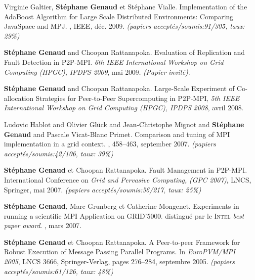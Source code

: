 \documentclass[11pt]{article}
\newcommand{\pmpi}{\mbox{\textsc{P2P-MPI}}}
\begin{document}
\begin{thebibliography}{99}
\newblock Virginie Galtier, \textbf{Stéphane Genaud} et Stéphane Vialle.
\newblock Implementation of the AdaBoost Algorithm for Large Scale Distributed 
Environments: Comparing JavaSpace and MPJ.
, 
IEEE, déc. 2009.
\newblock \small{\textit{(papiers acceptés/soumis:91/305, taux: 29\%)}}


\textbf{Stéphane Genaud} and Choopan Rattanapoka.
\newblock Evaluation of Replication and Fault Detection in P2P-MPI.
\newblock 
{\em 6th IEEE International Workshop on Grid Computing (HPGC), IPDPS 2009}, 
mai 2009.
\newblock \textit{(Papier invité)}.

\textbf{Stéphane Genaud} and Choopan Rattanapoka. 
\newblock Large-Scale Experiment of Co-allocation Strategies for Peer-to-Peer 
Supercomputing in P2P-MPI,
\newblock 
{\em 5th IEEE International Workshop on Grid Computing (HPGC), IPDPS 2008}, 
avril 2008.

Ludovic Hablot and Olivier Glück and Jean-Christophe Mignot and \textbf{Stéphane Genaud} and Pascale Vicat-Blanc Primet.
\newblock Comparison and tuning of MPI implementation in a grid context.
, 458--463, september 2007.
\newblock \small{\textit{(papiers acceptés/soumis:42/106, taux: 39\%)}}

\newblock \textbf{Stéphane Genaud} et Choopan Rattanapoka.
\newblock Fault Management in {\pmpi}. 
\newblock International Conference on {\em Grid and Pervasive Computing, 
(GPC 2007)}, LNCS, Springer, mai 2007.
\newblock \small{\textit{(papiers acceptés/soumis:56/217, taux: 25\%)}}

\newblock \textbf{Stéphane Genaud}, Marc Grunberg et Catherine Mongenet.
\newblock Experiments in running a scientific {MPI} Application on GRID'5000. 
\newblock distingué par le \textsc{Intel} \textit{best paper award}.
, mars 2007.


\textbf{Stéphane Genaud} et Choopan Rattanapoka.
\newblock A Peer-to-peer Framework for Robust Execution of Message Passing 
Parallel Programs.
\newblock 
In {\em EuroPVM/MPI 2005}, LNCS 3666, Springer-Verlag, pages 276--284, 
septembre 2005.
\newblock \small{\textit{(papiers acceptés/soumis:61/126, taux: 48\%)}}



\end{thebibliography}
\end{document}

